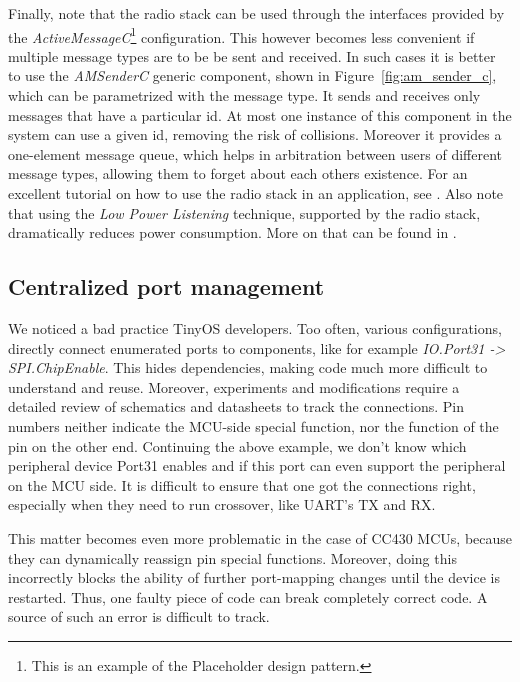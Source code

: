 Finally, note that the radio stack can be used through the interfaces provided by the \emph{ActiveMessageC}\footnote{This is an example of the Placeholder design pattern.} configuration. This however becomes less convenient if multiple message types are to be be sent and received. In such cases it is better to use the \emph{AMSenderC} generic component, shown in Figure~\ref{fig:am_sender_c}, which can be parametrized with the message type. It sends and receives only messages that have a particular id. At most one instance of this component in the system can use a given id, removing the risk of collisions. Moreover it provides a one-element message queue, which helps in arbitration between users of different message types, allowing them to forget about each others existence. For an excellent tutorial on how to use the radio stack in an application, see \cite{MoteToMote}. Also note that using the \emph{Low Power Listening} technique, supported by the radio stack, dramatically reduces power consumption. More on that can be found in \cite{LowPowerApps}.


\subsection{Centralized port management}

We noticed a bad practice TinyOS developers. Too often, various configurations, directly connect enumerated ports to components, like for example \emph{IO.Port31 -> SPI.ChipEnable}. This hides dependencies, making code much more difficult to understand and reuse. Moreover, experiments and modifications require a detailed review of schematics and datasheets to track the connections. Pin numbers neither indicate the MCU-side special function, nor the function of the pin on the other end. Continuing the above example, we don't know which peripheral device Port31 enables and if this port can even support the peripheral on the MCU side. It is difficult to ensure that one got the connections right, especially when they need to run crossover, like UART's TX and RX.

This matter becomes even more problematic in the case of CC430 MCUs, because they can dynamically reassign pin special functions. Moreover, doing this incorrectly blocks the ability of further port-mapping changes until the device is restarted. Thus, one faulty piece of code can break completely correct code. A source of such an error is difficult to track.

